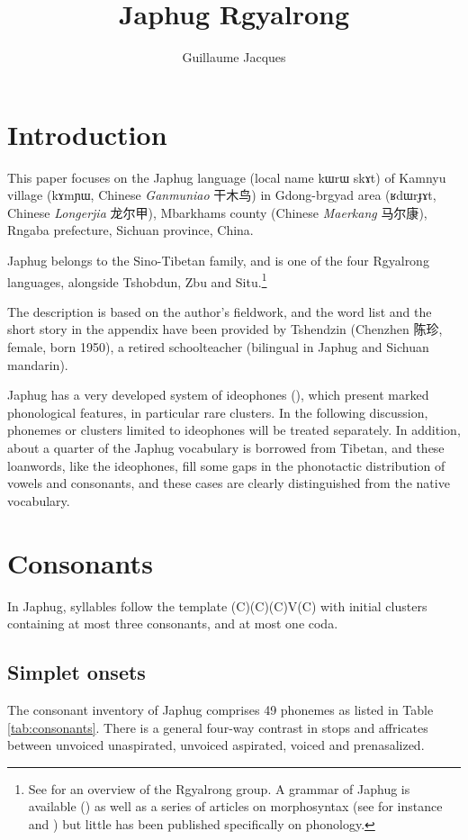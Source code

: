 \documentclass[oldfontcommands,oneside,a4paper,11pt]{article}
\newcommand{\ipa}[1]{{\phon #1}} %
\newcommand{\zh}[1]{{\cn #1}}
\begin{document}
 

\title{Japhug Rgyalrong}
\author{Guillaume Jacques}
\maketitle
\linenumbers
 \section{Introduction}
 This paper focuses on the Japhug language (local name \ipa{kɯrɯ skɤt}) of Kamnyu village (\ipa{kɤmɲɯ}, Chinese \textit{Ganmuniao} \zh{干木鸟}) in Gdong-brgyad area (\ipa{ʁdɯrɟɤt}, Chinese  \textit{Longerjia} \zh{龙尔甲}), Mbarkhams county (Chinese \textit{Maerkang} \zh{马尔康}), Rngaba prefecture, Sichuan province, China.
 
 Japhug belongs to the Sino-Tibetan family, and is one of the four Rgyalrong languages, alongside Tshobdun, Zbu and Situ.\footnote{See  \citet{jackson00sidaba} for an overview of the Rgyalrong group. A grammar of Japhug is available (\citealt{jacques08}) as well as a series of articles on morphosyntax (see for instance  \citealt{jacques13harmonization} and
 \citealt{jacques14antipassive}) but little has been published specifically on phonology. } 
 
The description is based on the author’s fieldwork, and the word list and the short story in the appendix have been provided by Tshendzin (Chenzhen \zh{陈珍}, female, born 1950), a retired schoolteacher (bilingual in Japhug and Sichuan mandarin).

 Japhug has a very developed system of ideophones (\citealt{japhug14ideophones}), which present marked phonological features, in particular rare clusters. In the following discussion, phonemes or clusters limited to ideophones will be treated separately. In addition, about a quarter of the Japhug vocabulary is borrowed from Tibetan, and these loanwords, like the ideophones, fill some gaps in the phonotactic distribution of vowels and consonants, and these cases are clearly distinguished from the native vocabulary.

 
 \section{Consonants}
 In Japhug, syllables follow the template (C)(C)(C)V(C) with initial clusters containing at most three consonants, and at most one coda.
 
 \subsection{Simplet onsets}
 The consonant inventory of Japhug comprises 49 phonemes as listed in Table \ref{tab:consonants}. There is a general four-way contrast in stops and affricates between unvoiced unaspirated, unvoiced aspirated, voiced and prenasalized.
 
\end{document}
